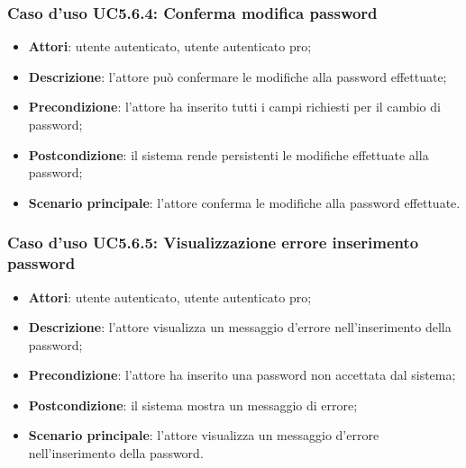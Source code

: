\subsubsection{Caso d'uso UC5.6.4: Conferma modifica password}

\begin{itemize}
	\item \textbf{Attori}: utente autenticato, utente autenticato pro;
	\item \textbf{Descrizione}: l'attore può confermare le modifiche alla password effettuate;
	\item \textbf{Precondizione}: l'attore ha inserito tutti i campi richiesti per il cambio di password;
	\item \textbf{Postcondizione}: il sistema rende persistenti le modifiche effettuate alla password;
	\item \textbf{Scenario principale}: l'attore conferma le modifiche alla password effettuate.
\end{itemize}

\subsubsection{Caso d'uso UC5.6.5: Visualizzazione errore inserimento password}
\begin{itemize}
	\item \textbf{Attori}: utente autenticato, utente autenticato pro;
	\item \textbf{Descrizione}: l'attore visualizza un messaggio d'errore nell'inserimento della password;
	\item \textbf{Precondizione}: l'attore ha inserito una password non accettata dal sistema;
	\item \textbf{Postcondizione}: il sistema mostra un messaggio di errore;
	\item \textbf{Scenario principale}: l'attore visualizza un messaggio d'errore  nell'inserimento della password.
\end{itemize}

